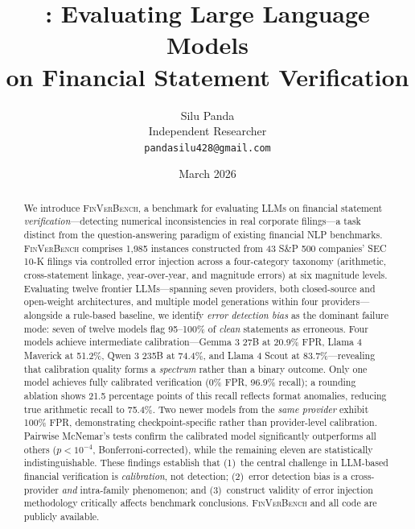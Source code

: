 \documentclass[11pt]{article}
\title{\benchmark{}: Evaluating Large Language Models \\on Financial Statement Verification}
\author{
  Silu Panda\\
  Independent Researcher\\
  \texttt{pandasilu428@gmail.com}
}
\date{March 2026}
\newcommand{\benchmark}{\textsc{FinVerBench}}
\begin{document}
\maketitle

\begin{abstract}
We introduce \benchmark{}, a benchmark for evaluating LLMs on financial statement \emph{verification}---detecting numerical inconsistencies in real corporate filings---a task distinct from the question-answering paradigm of existing financial NLP benchmarks.
\benchmark{} comprises 1,985 instances constructed from 43 S\&P 500 companies' SEC 10-K filings via controlled error injection across a four-category taxonomy (arithmetic, cross-statement linkage, year-over-year, and magnitude errors) at six magnitude levels.
Evaluating twelve frontier LLMs---spanning seven providers, both closed-source and open-weight architectures, and multiple model generations within four providers---alongside a rule-based baseline, we identify \emph{error detection bias} as the dominant failure mode: seven of twelve models flag 95--100\% of \emph{clean} statements as erroneous.
Four models achieve intermediate calibration---Gemma 3 27B at 20.9\% FPR, Llama 4 Maverick at 51.2\%, Qwen 3 235B at 74.4\%, and Llama 4 Scout at 83.7\%---revealing that calibration quality forms a \emph{spectrum} rather than a binary outcome.
Only one model achieves fully calibrated verification (0\% FPR, 96.9\% recall); a rounding ablation shows 21.5 percentage points of this recall reflects format anomalies, reducing true arithmetic recall to 75.4\%.
Two newer models from the \emph{same provider} exhibit 100\% FPR, demonstrating checkpoint-specific rather than provider-level calibration.
Pairwise McNemar's tests confirm the calibrated model significantly outperforms all others ($p < 10^{-4}$, Bonferroni-corrected), while the remaining eleven are statistically indistinguishable.
These findings establish that (1)~the central challenge in LLM-based financial verification is \emph{calibration}, not detection; (2)~error detection bias is a cross-provider \emph{and} intra-family phenomenon; and (3)~construct validity of error injection methodology critically affects benchmark conclusions.
\benchmark{} and all code are publicly available.
\end{abstract}

\end{document}
